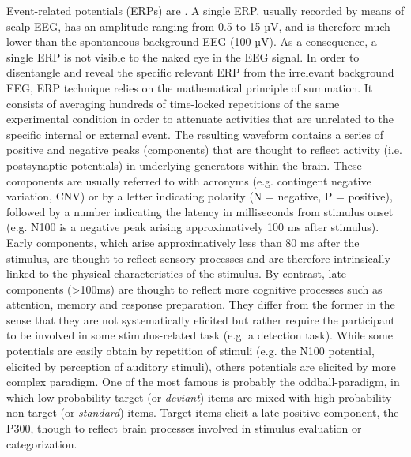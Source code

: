 Event-related potentials (ERPs) are  \citep{luck_introduction_2014}. A single ERP, usually recorded by means of scalp EEG, has an amplitude ranging from 0.5 to 15 µV, and is therefore much lower than the spontaneous background EEG (100 µV). As a consequence, a single ERP is not visible to the naked eye in the EEG signal. In order to disentangle and reveal the specific relevant ERP from the irrelevant background EEG, ERP technique relies on the mathematical principle of summation. It consists of averaging hundreds of time-locked repetitions of the same experimental condition in order to attenuate activities that are unrelated to the specific internal or external event.
The resulting waveform contains a series of positive and negative peaks (components) that are thought to reflect activity (i.e. postsynaptic potentials) in underlying generators within the brain. These components are usually referred to with acronyms (e.g. contingent negative variation, CNV) or by a letter indicating polarity (N = negative, P = positive), followed by a number indicating the latency in milliseconds from stimulus onset (e.g. N100 is a negative peak arising approximatively 100 ms after stimulus). Early components, which arise approximatively less than 80 ms after the stimulus, are thought to reflect sensory processes and are therefore intrinsically linked to the physical characteristics of the stimulus. By contrast, late components (>100ms) are thought to reflect more cognitive processes such as attention, memory and response preparation. They differ from the former in the sense that they are not systematically elicited but rather require the participant to be involved in some stimulus-related task (e.g. a detection task). While some potentials are easily obtain by repetition of stimuli (e.g. the N100 potential, elicited by perception of auditory stimuli), others potentials are elicited by more complex paradigm. One of the most famous is probably the oddball-paradigm, in which low-probability target (or \textit{deviant}) items are mixed with high-probability non-target (or \textit{standard}) items. Target items elicit a late positive component, the P300, though to reflect brain processes involved in stimulus evaluation or categorization.

